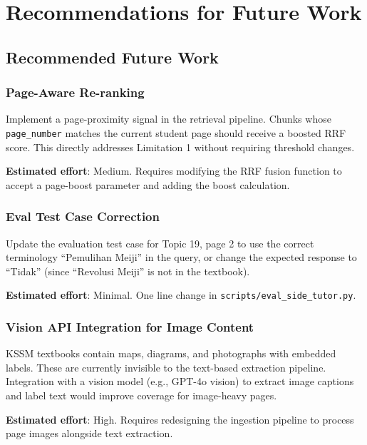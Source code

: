\documentclass[12pt, a4paper]{report}
\newcommand{\codeinline}[1]{\texttt{#1}}
\begin{document}
\chapter{Recommendations for Future Work}

\section{Recommended Future Work}

\subsection{Page-Aware Re-ranking}

Implement a page-proximity signal in the retrieval pipeline. Chunks whose
\codeinline{page\_number} matches the current student page should receive a
boosted RRF score. This directly addresses Limitation 1 without requiring
threshold changes.

\textbf{Estimated effort}: Medium. Requires modifying the RRF fusion function
to accept a page-boost parameter and adding the boost calculation.

\subsection{Eval Test Case Correction}

Update the evaluation test case for Topic 19, page 2 to use the correct
terminology ``Pemulihan Meiji'' in the query, or change the expected response
to ``Tidak'' (since ``Revolusi Meiji'' is not in the textbook).

\textbf{Estimated effort}: Minimal. One line change in
\codeinline{scripts/eval\_side\_tutor.py}.

\subsection{Vision API Integration for Image Content}

KSSM textbooks contain maps, diagrams, and photographs with embedded labels.
These are currently invisible to the text-based extraction pipeline. Integration
with a vision model (e.g., GPT-4o vision) to extract image captions and label
text would improve coverage for image-heavy pages.

\textbf{Estimated effort}: High. Requires redesigning the ingestion pipeline
to process page images alongside text extraction.
\end{document}
